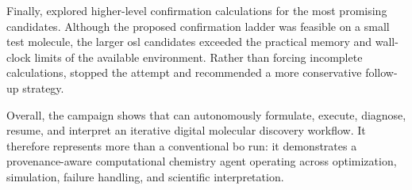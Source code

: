 Finally, \optima{} explored higher-level confirmation calculations for the most promising candidates.
Although the proposed confirmation ladder was feasible on a small test molecule, the larger \ac{osl} candidates exceeded the practical memory and wall-clock limits of the available environment.
Rather than forcing incomplete calculations, \optima{} stopped the attempt and recommended a more conservative follow-up strategy.

Overall, the campaign shows that \optima{} can autonomously formulate, execute, diagnose, resume, and interpret an iterative digital molecular discovery workflow.
It therefore represents more than a conventional \ac{bo} run: it demonstrates a provenance-aware computational chemistry agent operating across optimization, simulation, failure handling, and scientific interpretation.
